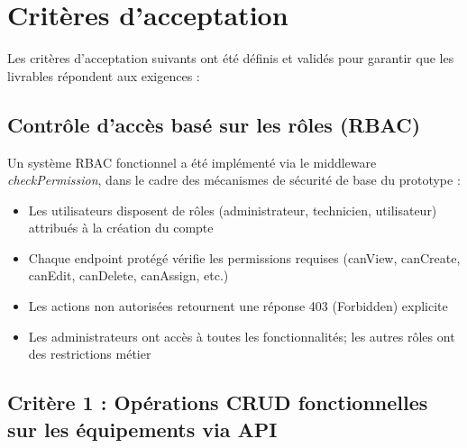 
\section{Critères d'acceptation}
\label{sec:acceptance_criteria_sprint1}

Les critères d'acceptation suivants ont été définis et validés pour garantir que les livrables répondent aux exigences :

\subsection*{Contrôle d'accès basé sur les rôles (RBAC)}

Un système RBAC fonctionnel a été implémenté via le middleware \textit{checkPermission}, dans le cadre des mécanismes de sécurité de base du prototype :
\begin{itemize}
    \item Les utilisateurs disposent de rôles (administrateur, technicien, utilisateur) attribués à la création du compte
    \item Chaque endpoint protégé vérifie les permissions requises (canView, canCreate, canEdit, canDelete, canAssign, etc.)
    \item Les actions non autorisées retournent une réponse 403 (Forbidden) explicite
    \item Les administrateurs ont accès à toutes les fonctionnalités; les autres rôles ont des restrictions métier
\end{itemize}

\subsection*{Critère 1 : Opérations CRUD fonctionnelles sur les équipements via API}

